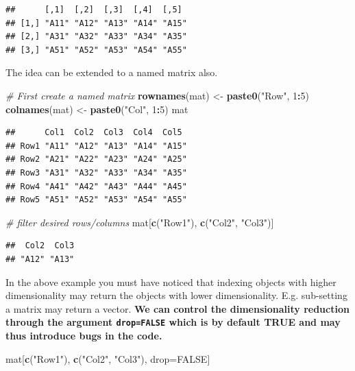 \documentclass[
]{book}
\newenvironment{Shaded}{\begin{snugshade}}{\end{snugshade}}
\newcommand{\CommentTok}[1]{\textcolor[rgb]{0.56,0.35,0.01}{\textit{#1}}}
\newcommand{\ConstantTok}[1]{\textcolor[rgb]{0.56,0.35,0.01}{#1}}
\newcommand{\DecValTok}[1]{\textcolor[rgb]{0.00,0.00,0.81}{#1}}
\newcommand{\FunctionTok}[1]{\textcolor[rgb]{0.13,0.29,0.53}{\textbf{#1}}}
\newcommand{\NormalTok}[1]{#1}
\newcommand{\OtherTok}[1]{\textcolor[rgb]{0.56,0.35,0.01}{#1}}
\newcommand{\SpecialCharTok}[1]{\textcolor[rgb]{0.81,0.36,0.00}{\textbf{#1}}}
\newcommand{\StringTok}[1]{\textcolor[rgb]{0.31,0.60,0.02}{#1}}
\begin{document}
\begin{verbatim}
##      [,1]  [,2]  [,3]  [,4]  [,5] 
## [1,] "A11" "A12" "A13" "A14" "A15"
## [2,] "A31" "A32" "A33" "A34" "A35"
## [3,] "A51" "A52" "A53" "A54" "A55"
\end{verbatim}

The idea can be extended to a named matrix also.

\begin{Shaded}
\begin{Highlighting}[]
\CommentTok{\# First create a named matrix}
\FunctionTok{rownames}\NormalTok{(mat) }\OtherTok{\textless{}{-}} \FunctionTok{paste0}\NormalTok{(}\StringTok{"Row"}\NormalTok{, }\DecValTok{1}\SpecialCharTok{:}\DecValTok{5}\NormalTok{)}
\FunctionTok{colnames}\NormalTok{(mat) }\OtherTok{\textless{}{-}} \FunctionTok{paste0}\NormalTok{(}\StringTok{"Col"}\NormalTok{, }\DecValTok{1}\SpecialCharTok{:}\DecValTok{5}\NormalTok{)}
\NormalTok{mat}
\end{Highlighting}
\end{Shaded}

\begin{verbatim}
##      Col1  Col2  Col3  Col4  Col5 
## Row1 "A11" "A12" "A13" "A14" "A15"
## Row2 "A21" "A22" "A23" "A24" "A25"
## Row3 "A31" "A32" "A33" "A34" "A35"
## Row4 "A41" "A42" "A43" "A44" "A45"
## Row5 "A51" "A52" "A53" "A54" "A55"
\end{verbatim}

\begin{Shaded}
\begin{Highlighting}[]
\CommentTok{\# filter desired rows/columns}
\NormalTok{mat[}\FunctionTok{c}\NormalTok{(}\StringTok{"Row1"}\NormalTok{), }\FunctionTok{c}\NormalTok{(}\StringTok{"Col2"}\NormalTok{, }\StringTok{"Col3"}\NormalTok{)]}
\end{Highlighting}
\end{Shaded}

\begin{verbatim}
##  Col2  Col3 
## "A12" "A13"
\end{verbatim}

In the above example you must have noticed that indexing objects with higher dimensionality may return the objects with lower dimensionality. E.g. sub-setting a matrix may return a vector. \textbf{We can control the dimensionality reduction through the argument \texttt{drop=FALSE} which is by default TRUE and may thus introduce bugs in the code.}

\begin{Shaded}
\begin{Highlighting}[]
\NormalTok{mat[}\FunctionTok{c}\NormalTok{(}\StringTok{"Row1"}\NormalTok{), }\FunctionTok{c}\NormalTok{(}\StringTok{"Col2"}\NormalTok{, }\StringTok{"Col3"}\NormalTok{), drop}\OtherTok{=}\ConstantTok{FALSE}\NormalTok{]}
\end{Highlighting}
\end{Shaded}
\end{document}
